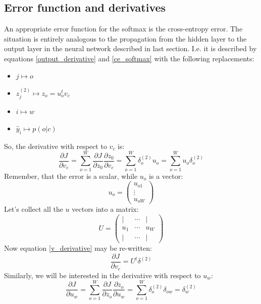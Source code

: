 \documentclass[12pt, a4paper]{article}
\numberwithin{equation}{section}
\begin{document}
\subsection{Error function and derivatives}
An appropriate error function for the softmax is the cross-entropy error. The situation is entirely analogous to the propagation from the hidden layer to the output layer in the neural network described in last section. I.e. it is described by equations \ref{output_derivative} and \ref{ce_softmax} with the following replacements:
\begin{itemize}
\item $j\mapsto o$
\item $z^{(2)}_j\mapsto z_o=u^t_o v_c$
\item $i\mapsto w$
\item $\hat{y}_i\mapsto p(o|c)$
\end{itemize}
So, the derivative with respect to $v_c$ is:
\begin{equation}
\label{v_derivative}
\frac{\partial J}{\partial v_c}=\sum_{o=1}^W\frac{\partial J}{\partial z_0}\frac{\partial z_0}{\partial v_c}=\sum_{o=1}^W\delta^{(2)}_o u_o=\sum_{o=1}^W u_o\delta^{(2)}_o
\end{equation}
Remember, that the error is a scalar, while $u_o$ is a vector:
\begin{equation}
u_o=
\begin{pmatrix}
u_{o1} \\ \vdots \\ u_{oW} 
\end{pmatrix}
\end{equation}
Let's collect all the $u$ vectors into a matrix:
\begin{equation}
U=
\begin{pmatrix}
| & \cdots & | \\
u_1 & \cdots & u_W \\
| & \cdots & |
\end{pmatrix}
\end{equation}
Now equation \ref{v_derivative} may be re-written:
\begin{equation}
\frac{\partial J}{\partial v_c}=U^t\delta^{(2)}
\end{equation}
Similarly, we will be interested in the derivative with respect to $u_w$:
\begin{equation}
\frac{\partial J}{\partial u_w}=\sum_{o=1}^W\frac{\partial J}{\partial z_o}\frac{\partial z_o}{\partial u_w}=\sum_{o=1}^W\delta^{(2)}_o\delta_{ow}=\delta^{(2)}_w
\end{equation}
\end{document}

